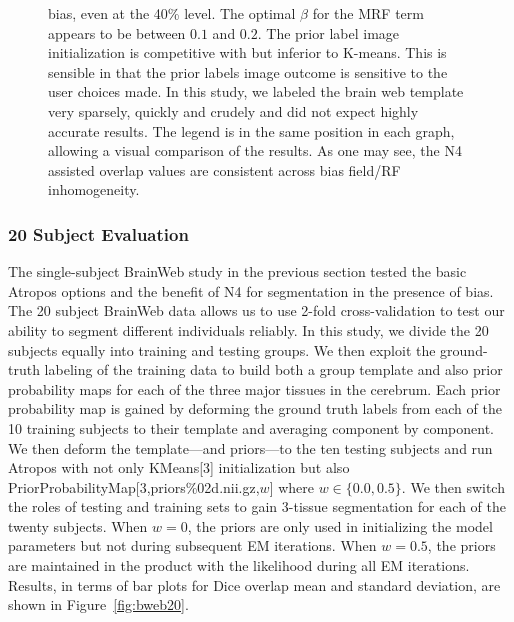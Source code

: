 \documentclass[11pt,english]{article}
\begin{document}
\begin{figure}
\begin{center}
{  bias, even at the 40\% level.  The optimal $\beta$ for the MRF term
  appears to be between $0.1$ and $0.2$.  The prior label image
  initialization is competitive with but inferior to K-means.  This is
  sensible in that the prior labels image outcome is sensitive to the
  user choices made.  In this study, we labeled the brain web template
  very sparsely, quickly and crudely and did not expect highly accurate results.  The
  legend is in the same position in each graph, allowing a visual
  comparison of the results.  As one may see, the N4 assisted overlap
  values are consistent across bias field/RF inhomogeneity.}
\label{fig:bweb1}
\end{center}
\end{figure}
\subsubsection{20 Subject Evaluation} The single-subject BrainWeb
study in the previous section tested the basic Atropos options and the
benefit of N4 for segmentation in the presence of bias.  The 20
subject BrainWeb data allows us to use 2-fold cross-validation to test
our ability to segment different individuals reliably.  In this study,
we divide the 20 subjects equally into training and testing groups.
We then exploit the ground-truth labeling of the training data to
build both a group template \citep{Avants2010} and also prior
probability maps for each of the three major tissues in the cerebrum.
Each prior probability map is gained by deforming the ground truth
labels from each of the 10 training subjects to their template and
averaging component by component.  We then deform the template---and
priors---to the ten testing subjects and run Atropos with not only
{\ttfamily KMeans[3]} initialization but also {\ttfamily
  PriorProbabilityMap[3,priors\%02d.nii.gz,$w$] } where $w \in
\{0.0,0.5\}$.  We then switch the roles of testing and training sets to
gain 3-tissue segmentation for each of the twenty subjects.  
When $w=0$, the priors are only used in initializing
the model parameters but not during subsequent EM iterations.  
When $w=0.5$, the priors are maintained in the product with the
likelihood during all EM iterations.  Results, in terms of bar
plots for Dice overlap mean and standard deviation, are shown in Figure~\ref{fig:bweb20}.
\end{document}
